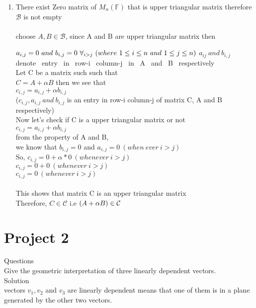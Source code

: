 \documentclass[45pt]{article}
\begin{document}
\begin{enumerate}
\item There exist Zero matrix of $M_n(\mathbb{F})$ that is upper triangular matrix therefore $\mathcal{B}$ is not empty\\\\
choose $A, B \in \mathcal{B} $, since A and B are upper triangular matrix then 

$ a_{i,j}=0 ~ and ~ b_{i,j}=0~ \forall_{i>j} ~ (where ~ 1 \leq i \leq n ~and ~1 \leq j \leq n )\\$
$a_{ij} ~ and ~ b_{i,j}$~ denote~ entry~ in~ row-i ~column-j ~in ~A~ and ~B~ respectively\\
Let C be a matrix such such that \\
$C= A+ \alpha B $ then we see that \\
$c_{i,j}=a_{i,j}+\alpha b_{i,j} $\\
($ c_{i,j},a_{i,j}~ and ~b_{i,j} $ is an entry in row-i column-j of matrix C, A and B respectively)\\

Now let's check if C is a upper triangular matrix or not\\
$c_{i,j}=a_{i,j}+\alpha b_{i,j} $\\
from the property of A and B,\\ we know that $b_{i,j}=0$ and $a_{i,j}=0 ~(when~ever ~i>j)$\\
So, $c_{i,j}=0+\alpha *0 ~(whenever~ i > j)$\\
$c_{i,j}=0+0 ~(whenever ~i>j)$ \\
$c_{i,j}=0 ~(whenever ~ i>j)$ \\\\
This shows that matrix C is an upper triangular matrix\\
Therefore, $ C \in \mathcal{C} $ i.e $(A+\alpha B) \in \mathcal{C}\\\\$
\end{enumerate}
\vspace{2,0cm}
\section*{\Huge{Project 2}}
\Large{Questions}\\
Give the geometric interpretation of three linearly dependent vectors.\\

\Large{Solution}\\

vectors $v_1,v_2$ and $v_3$ are linearly dependent means that one of them is in a plane generated by the other two vectors.
\end{document}

